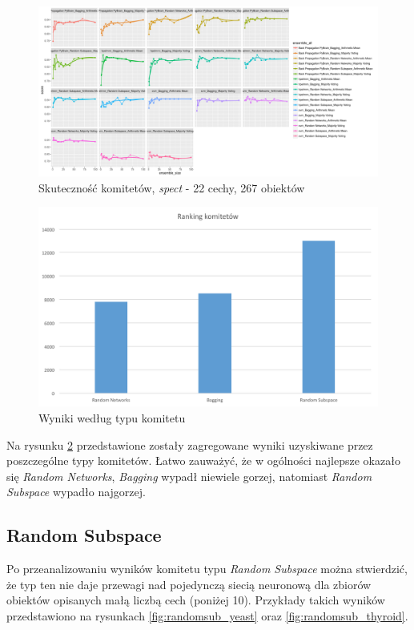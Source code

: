 \documentclass[11pt, a4paper, titlepage]{report}
\begin{document}
\begin{figure}[H]
	\includegraphics[width=1.0\textwidth]{type2_score_size_model_spect}
    \centering
    \caption{Skuteczność komitetów, \textit{spect} - 22 cechy, 267 obiektów}
    \label{fig:type2_spect}
\end{figure}

\begin{figure}[H]
	\includegraphics[width=1.0\textwidth]{aggregated_rank_ensemble}
    \centering
    \caption{Wyniki według typu komitetu}
    \label{fig:ensemble_type}
\end{figure}

Na rysunku \ref{fig:ensemble_type} przedstawione zostały zagregowane wyniki uzyskiwane przez poszczególne typy komitetów. Łatwo zauważyć, że w ogólności najlepsze okazało się \textit{Random Networks}, \textit{Bagging} wypadł niewiele gorzej, natomiast \textit{\textit{Random Subspace}} wypadło najgorzej.

\subsection{Random Subspace}
Po przeanalizowaniu wyników komitetu typu \textit{Random Subspace} można stwierdzić, że typ ten nie daje przewagi nad pojedynczą siecią neuronową dla zbiorów obiektów opisanych małą liczbą cech (poniżej 10). Przykłady takich wyników przedstawiono na rysunkach \ref{fig:randomsub_yeast} oraz \ref{fig:randomsub_thyroid}.
\end{document}
